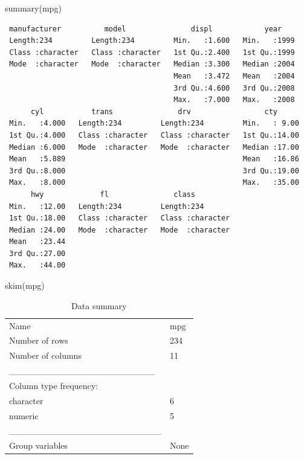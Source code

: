 \documentclass[
  letterpaper,
  DIV=11,
  numbers=noendperiod]{scrartcl}
\newenvironment{Shaded}{\begin{snugshade}}{\end{snugshade}}
\newcommand{\FunctionTok}[1]{\textcolor[rgb]{0.28,0.35,0.67}{#1}}
\newcommand{\NormalTok}[1]{\textcolor[rgb]{0.00,0.23,0.31}{#1}}
\begin{document}
\begin{Shaded}
\begin{Highlighting}[]
\FunctionTok{summary}\NormalTok{(mpg)}
\end{Highlighting}
\end{Shaded}

\begin{verbatim}
 manufacturer          model               displ            year     
 Length:234         Length:234         Min.   :1.600   Min.   :1999  
 Class :character   Class :character   1st Qu.:2.400   1st Qu.:1999  
 Mode  :character   Mode  :character   Median :3.300   Median :2004  
                                       Mean   :3.472   Mean   :2004  
                                       3rd Qu.:4.600   3rd Qu.:2008  
                                       Max.   :7.000   Max.   :2008  
      cyl           trans               drv                 cty       
 Min.   :4.000   Length:234         Length:234         Min.   : 9.00  
 1st Qu.:4.000   Class :character   Class :character   1st Qu.:14.00  
 Median :6.000   Mode  :character   Mode  :character   Median :17.00  
 Mean   :5.889                                         Mean   :16.86  
 3rd Qu.:8.000                                         3rd Qu.:19.00  
 Max.   :8.000                                         Max.   :35.00  
      hwy             fl               class          
 Min.   :12.00   Length:234         Length:234        
 1st Qu.:18.00   Class :character   Class :character  
 Median :24.00   Mode  :character   Mode  :character  
 Mean   :23.44                                        
 3rd Qu.:27.00                                        
 Max.   :44.00                                        
\end{verbatim}

\begin{Shaded}
\begin{Highlighting}[]
\FunctionTok{skim}\NormalTok{(mpg)}
\end{Highlighting}
\end{Shaded}

\begin{longtable}[]{@{}ll@{}}
\caption{Data summary}\tabularnewline
\toprule\noalign{}
\endfirsthead
\endhead
\bottomrule\noalign{}
\endlastfoot
Name & mpg \\
Number of rows & 234 \\
Number of columns & 11 \\
\_\_\_\_\_\_\_\_\_\_\_\_\_\_\_\_\_\_\_\_\_\_\_ & \\
Column type frequency: & \\
character & 6 \\
numeric & 5 \\
\_\_\_\_\_\_\_\_\_\_\_\_\_\_\_\_\_\_\_\_\_\_\_\_ & \\
Group variables & None \\
\end{longtable}
\end{document}
